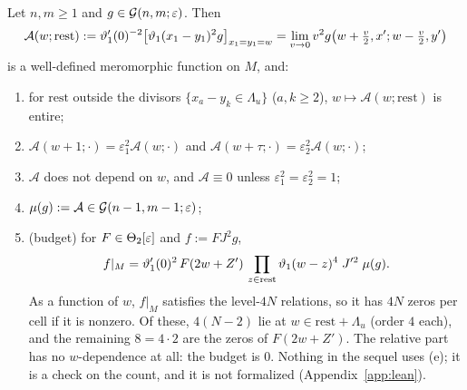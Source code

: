 \begin{lemma}\label{kz:lem:C}
Let $n,m\ge1$ and $g\in\mathcal{G}(n,m;\varepsilon)$. Then
\[
\mathcal A(w;\mathrm{rest}):=\vartheta_1'(0)^{-2}\big[\vartheta_1(x_1-y_1)^2g\big]_{x_1=y_1=w}
=\lim_{v\to0}v^2g\big(w+\tfrac v2,x';w-\tfrac v2,y'\big)
\]
is a well-defined meromorphic function on $M$, and:
\begin{enumerate}
\item[(a)] for $\mathrm{rest}$ outside the divisors $\{x_a-y_k\in\Lambda_u\}$ ($a,k\ge2$), $w\mapsto\mathcal A(w;\mathrm{rest})$ is entire;
\item[(b)] $\mathcal A(w+1;\cdot)=\varepsilon_1^2\mathcal A(w;\cdot)$ and $\mathcal A(w+\tau;\cdot)=\varepsilon_2^2\mathcal A(w;\cdot)$;
\item[(c)] $\mathcal A$ does not depend on $w$, and $\mathcal A\equiv0$ unless $\varepsilon_1^2=\varepsilon_2^2=1$;
\item[(d)] $\mu(g):=\mathcal A\in\mathcal{G}(n-1,m-1;\varepsilon)$;
\item[(e)] \textup{(budget)} for $F\in\Theta_2[\varepsilon]$ and $f:=FJ^2g$,
\[
f|_M=\vartheta_1'(0)^2\,F(2w+Z')\,\prod_{z\in\mathrm{rest}}\vartheta_1(w-z)^4\;J'^2\;\mu(g).
\]
As a function of $w$, $f|_M$ satisfies the level-$4N$ relations, so it has $4N$ zeros per cell if it is
nonzero. Of these, $4(N-2)$ lie at $w\in\mathrm{rest}+\Lambda_u$ (order $4$ each), and the remaining
$8=4\cdot2$ are the zeros of $F(2w+Z')$. The relative part has no $w$-dependence at all: the budget is $0$. Nothing in
the sequel uses (e); it is a check on the count, and it is not formalized (Appendix~\ref{app:lean}).
\end{enumerate}
\end{lemma}

